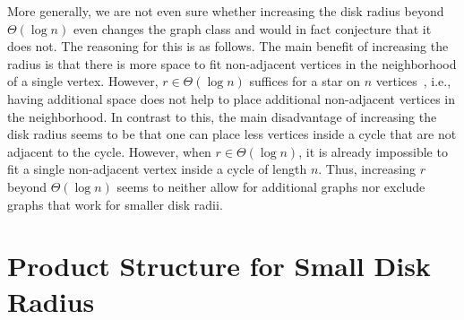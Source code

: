 \documentclass[a4paper,english,cleveref,thm-restate]{lipics-v2021}
\begin{document}
More generally, we are not even sure whether increasing the disk radius beyond $\Theta(\log n)$ even changes the graph class and would in fact conjecture that it does not.
The reasoning for this is as follows.
The main benefit of increasing the radius is that there is more space to fit non-adjacent vertices in the neighborhood of a single vertex.
However, $r \in \Theta(\log n)$ suffices for a star on $n$ vertices~\cite{Struc_Indep_Hyper_Unifor_Disk_Graph-Blaesius25}, i.e., having additional space does not help to place additional non-adjacent vertices in the neighborhood.
In contrast to this, the main disadvantage of increasing the disk radius seems to be that one can place less vertices inside a cycle that are not adjacent to the cycle.
However, when $r \in \Theta(\log n)$, it is already impossible to fit a single non-adjacent vertex inside a cycle of length $n$.
Thus, increasing $r$ beyond $\Theta(\log n)$ seems to neither allow for additional graphs nor exclude graphs that work for smaller disk radii.




% 




\section{Product Structure for Small Disk Radius}
\label{sec:upper_bound}

\newcommand{\upperBound}{3^{8r}}
\end{document}
